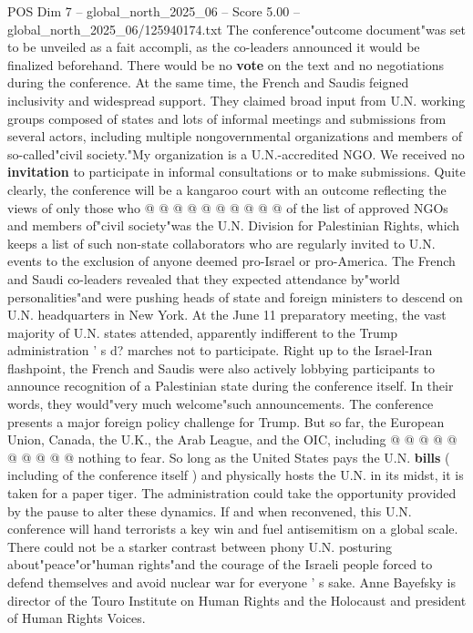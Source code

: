 \begin{textsample}{POS Dim 7 – global\_north\_2025\_06 – Score 5.00 – global\_north\_2025\_06/125940174.txt}
The conference"outcome document"was set to be unveiled as a fait accompli, as the co-leaders announced it would be finalized beforehand.
There would be no \textbf{vote} on the text and no negotiations during the conference.
At the same time, the French and Saudis feigned inclusivity and widespread support.
They claimed broad input from U.N. working groups composed of states and lots of informal meetings and submissions from several actors, including multiple nongovernmental organizations and members of so-called"civil society."My organization is a U.N.-accredited NGO.
We received no \textbf{invitation} to participate in informal consultations or to make submissions.
Quite clearly, the conference will be a kangaroo court with an outcome reflecting the views of only those who @ @ @ @ @ @ @ @ @ @ of the list of approved NGOs and members of"civil society"was the U.N.
Division for Palestinian Rights, which keeps a list of such non-state collaborators who are regularly invited to U.N. events to the exclusion of anyone deemed pro-Israel or pro-America.
The French and Saudi co-leaders revealed that they expected attendance by"world personalities"and were pushing heads of state and foreign ministers to descend on U.N. headquarters in New York.
At the June 11 preparatory meeting, the vast majority of U.N. states attended, apparently indifferent to the Trump administration ' s d? marches not to participate.
Right up to the Israel-Iran flashpoint, the French and Saudis were also actively lobbying participants to announce recognition of a Palestinian state during the conference itself.
In their words, they would"very much welcome"such announcements.
The conference presents a major foreign policy challenge for Trump.
But so far, the European Union, Canada, the U.K., the Arab League, and the OIC, including @ @ @ @ @ @ @ @ @ @ nothing to fear.
So long as the United States pays the U.N. \textbf{bills} ( including of the conference itself ) and physically hosts the U.N. in its midst, it is taken for a paper tiger.
The administration could take the opportunity provided by the pause to alter these dynamics.
If and when reconvened, this U.N. conference will hand terrorists a key win and fuel antisemitism on a global scale.
There could not be a starker contrast between phony U.N. posturing about"peace"or"human rights"and the courage of the Israeli people forced to defend themselves and avoid nuclear war for everyone ' s sake.
Anne Bayefsky is director of the Touro Institute on Human Rights and the Holocaust and president of Human Rights Voices.

\end{textsample}
